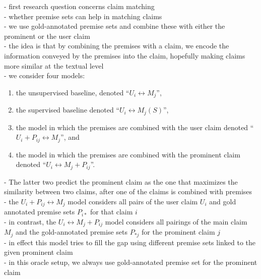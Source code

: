 - first research question concerns claim matching \\
- whether premise sets can help in matching claims \\
- we use gold-annotated premise sets and combine these with either the prominent
or the user claim \\
- the idea is that by combining the premises with a claim, we encode 
the information conveyed by the premises into the claim, 
hopefully making claims more similar at the textual level \\
- we consider four models: \begin{enumerate}[label=\arabic*)]
\item the unsupervised baseline, denoted ``$U_i \leftrightarrow M_j$'',
\item the supervised baseline denoted ``$U_i \leftrightarrow M_j (S)$'', 
\item the model in which the premises are combined with the user claim 
denoted ``$U_i + P_{ij} \leftrightarrow M_j$'', and 
\item the model in which the premises are combined with the prominent claim denoted
``$U_i \leftrightarrow M_j + P_{ij}$''. 
\end{enumerate}
- The latter two predict the prominent claim as the one that maximizes the 
similarity between two claims, after one of the claims is combined with premises \\
- the $U_i + P_{ij} \leftrightarrow M_j$ model considers all pairs of the user claim $U_i$ 
and gold annotated premise sets $P_{i*}$ for that claim $i$ \\
- in contrast, the $U_i \leftrightarrow M_j + P_{ij}$ model considers all pairings
of the main claim $M_j$ and the gold-annotated premise sets $P_{*j}$ for the prominent 
claim $j$ \\
- in effect this model tries to fill the gap using different premise sets linked to the given prominent
claim \\
- in this oracle setup, we always use gold-annotated premise set for the prominent claim \\

